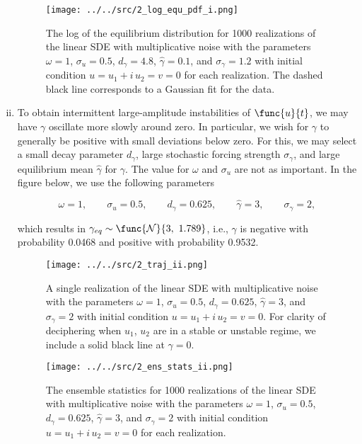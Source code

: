 \begin{enumerate}[(i)]
	\begin{figure}[H]
		\centering
		\texttt{[image: ../../src/2\_log\_equ\_pdf\_i.png]}
		\caption{The log of the equilibrium distribution for 1000 realizations of the linear SDE with multiplicative noise with the parameters $\omega = 1$, $\sigma_u = 0.5$, $d_{\gamma} = 4.8$, $\widehat{\gamma} = 0.1$, and $\sigma_{\gamma} = 1.2$ with initial condition $u = u_1 + i\,u_2 = v = 0$ for each realization. The dashed black line corresponds to a Gaussian fit for the data.}
		\label{fig:2_log_equ_pdf_i}
	\end{figure}
	
	\item To obtain intermittent large-amplitude instabilities of $\func{u}{t}$, we may have $\gamma$ oscillate more slowly around zero. In particular, we wish for $\gamma$ to generally be positive with small deviations below zero. For this, we may select a small decay parameter $d_{\gamma}$, large stochastic forcing strength $\sigma_{\gamma}$, and large equilibrium mean $\widehat{\gamma}$ for $\gamma$. The value for $\omega$ and $\sigma_u$ are not as important. In the figure below, we use the following parameters
	
	\begin{equation}
		\omega = 1,\qquad \sigma_u = 0.5,\qquad d_{\gamma} = 0.625,\qquad \widehat{\gamma} = 3,\qquad \sigma_{\gamma} = 2,
	\end{equation}
	
	which results in $\gamma_{eq} \sim \func{\mathcal{N}}{3,\ 1.789}$, i.e., $\gamma$ is negative with probability 0.0468 and positive with probability 0.9532.
	

	\begin{figure}[H]
		\centering
		\texttt{[image: ../../src/2\_traj\_ii.png]}
		\caption{A single realization of the linear SDE with multiplicative noise with the parameters $\omega = 1$, $\sigma_u = 0.5$, $d_{\gamma} = 0.625$, $\widehat{\gamma} = 3$, and $\sigma_{\gamma} = 2$ with initial condition $u = u_1 + i\,u_2 = v = 0$. For clarity of deciphering when $u_1$, $u_2$ are in a stable or unstable regime, we include a solid black line at $\gamma = 0$.}
		\label{fig:2_traj_ii}
	\end{figure}

	\begin{figure}[H]
		\centering
		\texttt{[image: ../../src/2\_ens\_stats\_ii.png]}
		\caption{The ensemble statistics for 1000 realizations of the linear SDE with multiplicative noise with the parameters $\omega = 1$, $\sigma_u = 0.5$, $d_{\gamma} = 0.625$, $\widehat{\gamma} = 3$, and $\sigma_{\gamma} = 2$ with initial condition $u = u_1 + i\,u_2 = v = 0$ for each realization.}
		\label{fig:2_ens_stats_ii}
	\end{figure}
	

\end{enumerate}
